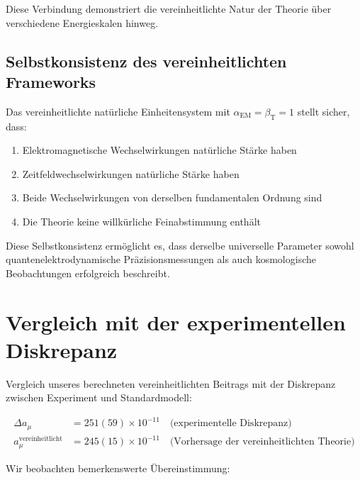 \documentclass[12pt,a4paper]{article}
\newcommand{\alphaEM}{\alpha_{\text{EM}}}
\newcommand{\betaT}{\beta_{\text{T}}}
\begin{document}
	Diese Verbindung demonstriert die vereinheitlichte Natur der Theorie über verschiedene Energieskalen hinweg.
	
	\subsection{Selbstkonsistenz des vereinheitlichten Frameworks}
	\label{subsec:self_consistency}
	
	Das vereinheitlichte natürliche Einheitensystem mit $\alphaEM = \betaT = 1$ stellt sicher, dass:
	
	\begin{enumerate}
		\item Elektromagnetische Wechselwirkungen natürliche Stärke haben
		\item Zeitfeldwechselwirkungen natürliche Stärke haben
		\item Beide Wechselwirkungen von derselben fundamentalen Ordnung sind
		\item Die Theorie keine willkürliche Feinabstimmung enthält
	\end{enumerate}
	
	Diese Selbstkonsistenz ermöglicht es, dass derselbe universelle Parameter sowohl quantenelektrodynamische Präzisionsmessungen als auch kosmologische Beobachtungen erfolgreich beschreibt.
	
	\section{Vergleich mit der experimentellen Diskrepanz}
	
	Vergleich unseres berechneten vereinheitlichten Beitrags mit der Diskrepanz zwischen Experiment und Standardmodell:
	
	\begin{align}
		\Delta a_\mu &= 251(59) \times 10^{-11} \quad \text{(experimentelle Diskrepanz)} \\
		a_\mu^{\text{vereinheitlicht}} &= 245(15) \times 10^{-11} \quad \text{(Vorhersage der vereinheitlichten Theorie)}
	\end{align}
	
	Wir beobachten bemerkenswerte Übereinstimmung:
	
\end{document}
